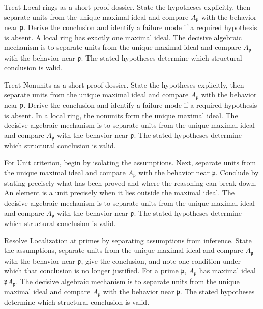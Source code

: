 \begin{example}\label{ex:v08-worked-01}
Treat Local rings as a short proof dossier. State the hypotheses explicitly, then separate units from the unique maximal ideal and compare \(A_{\mathfrak p}\) with the behavior near \(\mathfrak p\). Derive the conclusion and identify a failure mode if a required hypothesis is absent. A local ring has exactly one maximal ideal. The decisive algebraic mechanism is to separate units from the unique maximal ideal and compare \(A_{\mathfrak p}\) with the behavior near \(\mathfrak p\). The stated hypotheses determine which structural conclusion is valid.
\end{example}

\begin{example}\label{ex:v08-worked-02}
Treat Nonunits as a short proof dossier. State the hypotheses explicitly, then separate units from the unique maximal ideal and compare \(A_{\mathfrak p}\) with the behavior near \(\mathfrak p\). Derive the conclusion and identify a failure mode if a required hypothesis is absent. In a local ring, the nonunits form the unique maximal ideal. The decisive algebraic mechanism is to separate units from the unique maximal ideal and compare \(A_{\mathfrak p}\) with the behavior near \(\mathfrak p\). The stated hypotheses determine which structural conclusion is valid.
\end{example}

\begin{example}\label{ex:v08-worked-03}
For Unit criterion, begin by isolating the assumptions. Next, separate units from the unique maximal ideal and compare \(A_{\mathfrak p}\) with the behavior near \(\mathfrak p\). Conclude by stating precisely what has been proved and where the reasoning can break down. An element is a unit precisely when it lies outside the maximal ideal. The decisive algebraic mechanism is to separate units from the unique maximal ideal and compare \(A_{\mathfrak p}\) with the behavior near \(\mathfrak p\). The stated hypotheses determine which structural conclusion is valid.
\end{example}

\begin{example}\label{ex:v08-worked-04}
Resolve Localization at primes by separating assumptions from inference. State the assumptions, separate units from the unique maximal ideal and compare \(A_{\mathfrak p}\) with the behavior near \(\mathfrak p\), give the conclusion, and note one condition under which that conclusion is no longer justified. For a prime $\mathfrak p$, $A_{\mathfrak p}$ has maximal ideal $\mathfrak p A_{\mathfrak p}$. The decisive algebraic mechanism is to separate units from the unique maximal ideal and compare \(A_{\mathfrak p}\) with the behavior near \(\mathfrak p\). The stated hypotheses determine which structural conclusion is valid.
\end{example}

